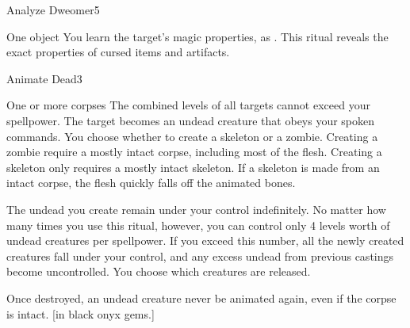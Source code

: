 \begin{spellsection}{Analyze Dweomer}{5}
\begin{spelltarget}{One object}
    \spelleffect You learn the target's magic properties, as . This ritual reveals the exact properties of cursed items and artifacts.
\end{spelltarget}
\end{spellsection}

\begin{spellsection}{Animate Dead}{3}
\begin{spelltarget}{One or more corpses}
    \spellspecial The combined levels of all targets cannot exceed your spellpower.
    \spelleffect The target becomes an undead creature that obeys your spoken commands. You choose whether to create a skeleton or a zombie. Creating a zombie require a mostly intact corpse, including most of the flesh. Creating a skeleton only requires a mostly intact skeleton. If a skeleton is made from an intact corpse, the flesh quickly falls off the animated bones.
\end{spelltarget}
\spellnotes The undead you create remain under your control indefinitely. No matter how many times you use this ritual, however, you can control only 4 levels worth of undead creatures per spellpower. If you exceed this number, all the newly created creatures fall under your control, and any excess undead from previous castings become uncontrolled. You choose which creatures are released.

Once destroyed, an undead creature never be animated again, even if the corpse is intact.
[in black onyx gems.]
\end{spellsection}

